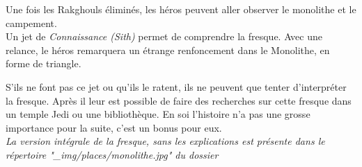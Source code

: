 Une fois les Rakghouls éliminés, les héros peuvent aller observer le monolithe et le campement.
\\

Un jet de \textit{Connaissance (Sith)} permet de comprendre la fresque. Avec une relance, le héros remarquera un étrange renfoncement dans le Monolithe, en forme de triangle.

S’ils ne font pas ce jet ou qu’ils le ratent, ils ne peuvent que tenter d’interpréter la fresque. Après il leur est possible de faire des recherches sur cette fresque dans un temple Jedi ou une bibliothèque. En soi l’histoire n’a pas une grosse importance pour la suite, c’est un bonus pour eux.
\\

\textit{La version intégrale de la fresque, sans les explications est présente dans le répertoire "\_img/places/monolithe.jpg" du dossier}

\clearpage

